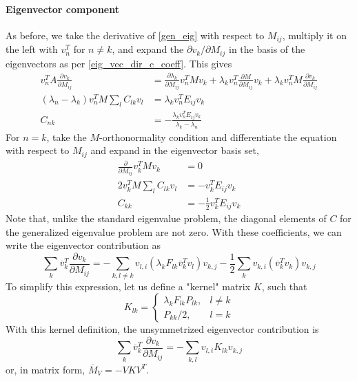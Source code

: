 \documentclass[11pt, a4paper]{article}
\begin{document}
\paragraph{Eigenvector component}
As before, we take the derivative of \eqref{gen_eig} with respect to $M_{ij}$, multiply it on the left with $v_n^T$ for $n\ne k$, and expand the $\partial v_k/\partial M_{ij}$ in the basis of the eigenvectors as per \eqref{eig_vec_dir_c_coeff}. This gives
\begin{align}
    v_n^TA\frac{\partial v_k}{\partial M_{ij}} & = \frac{\partial \lambda_k}{\partial M_{ij}}v_n^TMv_k + \lambda_kv_n^T\frac{\partial M}{\partial M_{ij}}v_k + \lambda_kv_n^TM\frac{\partial v_k}{\partial M_{ij}} \\
    (\lambda_n - \lambda_k)v_n^TM \sum_l C_{lk}v_l  & = \lambda_kv_n^TE_{ij}v_k \\
    C_{nk} & = -\frac{\lambda_kv_n^TE_{ij}v_k}{\lambda_k - \lambda_n}
\end{align}
For $n = k$, take the $M$-orthonormality condition and differentiate the equation with respect to $M_{ij}$ and expand in the eigenvector basis set,
\begin{align}
    \frac{\partial}{\partial M_{ij}} v_k^TMv_k & = 0 \\
    2v_k^TM\sum_l C_{lk}v_l & = -v_k^TE_{ij}v_k \\
    C_{kk} & = -\frac 1 2 v_k^T E_{ij} v_k
\end{align}
Note that, unlike the standard eigenvalue problem, the diagonal elements of $C$ for the generalized eigenvalue problem are not zero. With these coefficients, we can write the eigenvector contribution as
\begin{equation}
    \sum_k\overline{v}_k^T\frac{\partial v_k}{\partial M_{ij}} = -\sum_{k,l\ne k} v_{l,i}(\lambda_kF_{lk}\overline{v}_k^Tv_l)v_{k,j} -\frac 1 2 \sum_k v_{k,i}(\overline{v}_k^Tv_k)v_{k,j}
\end{equation}
To simplify this expression, let us define a "kernel" matrix $K$, such that
\begin{equation}
    K_{lk} = \begin{cases}
        \lambda_kF_{lk}P_{lk}, & l\ne k \\
        P_{kk}/2, & l = k
    \end{cases}
\end{equation}
With this kernel definition, the unsymmetrized eigenvector contribution is
\begin{equation}
    \sum_k\overline{v}_k^T\frac{\partial v_k}{\partial M_{ij}} = -\sum_{k,l}v_{l,i}K_{lk}v_{k,j}
\end{equation}
or, in matrix form, $\overline{M}_V=-VKV^T$.
\end{document}
